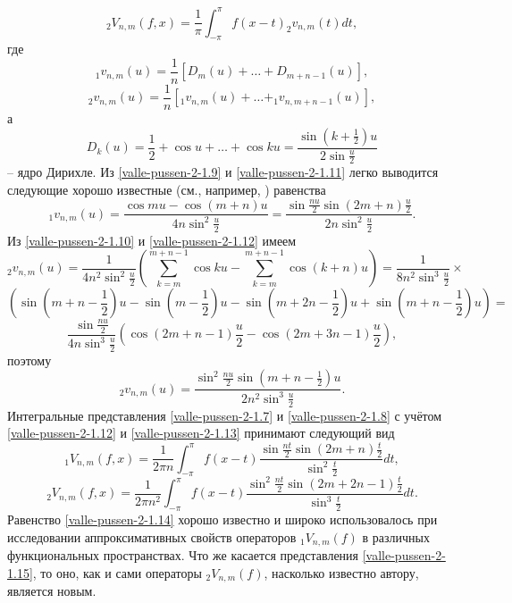 \begin{equation}\label{valle-pussen-2-1.8}
 _2V_{n,m}(f,x)=\frac{1}{\pi}\int_{-\pi}^\pi f(x-t)_2v_{n,m}(t)dt,
 \end{equation}
где
\begin{equation}\label{valle-pussen-2-1.9}
 _1v_{n,m}(u)=\frac{1}{n}[D_m(u)+\ldots+D_{m+n-1}(u)],
 \end{equation}
\begin{equation}\label{valle-pussen-2-1.10}
 _2v_{n,m}(u)=\frac{1}{n}[_1v_{n,m}(u)+\ldots+_1v_{n,m+n-1}(u)],
 \end{equation}
 а
\begin{equation}\label{valle-pussen-2-1.11}
D_k(u) =\frac{1}{2}+\cos u +\ldots+\cos ku =\frac{\sin(k+\frac12)u}{2\sin\frac{u}{2}}
 \end{equation}
-- ядро Дирихле. Из \eqref{valle-pussen-2-1.9} и \eqref{valle-pussen-2-1.11} легко выводится следующие хорошо известные (см., например, \cite{valle-pussen-2-Zhuk}) равенства
\begin{equation}\label{valle-pussen-2-1.12}
_1v_{n,m}(u) =\frac{\cos mu-\cos (m+n)u}{4n\sin^2\frac{u}{2}}=
\frac{\sin\frac{nu}{2}\sin(2m+n)\frac{u}{2}}{2n\sin^2\frac{u}{2}}.
 \end{equation}
Из \eqref{valle-pussen-2-1.10} и \eqref{valle-pussen-2-1.12} имеем
\begin{equation*}
 _2v_{n,m}(u)=\frac{1}{4n^2\sin^2\frac{u}{2}}\left(\sum_{k=m}^{m+n-1}\cos ku-
 \sum_{k=m}^{m+n-1}\cos(k+n)u\right)=\frac{1}{8n^2\sin^3\frac{u}{2}}\times
 \end{equation*}
\begin{equation*}
 \left(\sin(m+n-\frac12)u-\sin(m-\frac12)u
 -\sin(m+2n-\frac12)u+\sin(m+n-\frac12)u\right)=
 \end{equation*}
\begin{equation*}
 \frac{\sin\frac{nu}{2}}{4n\sin^3\frac{u}{2}}
 \left(\cos(2m+n-1)\frac{u}{2}-\cos(2m+3n-1)\frac{u}{2}\right),
  \end{equation*}
поэтому
\begin{equation}\label{valle-pussen-2-1.13}
 _2v_{n,m}(u)=\frac{\sin^2\frac{nu}{2}\sin(m+n-\frac12)u}{2n^2\sin^3\frac{u}{2}}.
  \end{equation}
Интегральные представления \eqref{valle-pussen-2-1.7} и \eqref{valle-pussen-2-1.8} с учётом  \eqref{valle-pussen-2-1.12} и \eqref{valle-pussen-2-1.13}  принимают следующий вид
\begin{equation}\label{valle-pussen-2-1.14}
 _1V_{n,m}(f,x)=\frac{1}{2\pi n}\int_{-\pi}^\pi f(x-t) \frac{\sin\frac{nt}{2}\sin(2m+n)\frac{t}{2}}{\sin^2\frac{t}{2}}dt,
 \end{equation}
\begin{equation}\label{valle-pussen-2-1.15}
 _2V_{n,m}(f,x)=\frac{1}{2\pi n^2}\int_{-\pi}^\pi f(x-t) \frac{\sin^2\frac{nt}{2}\sin(2m+2n-1)\frac{t}{2}}{\sin^3\frac{t}{2}}dt.
 \end{equation}
Равенство \eqref{valle-pussen-2-1.14} хорошо известно и широко использовалось \cite{valle-pussen-2-Zhuk} при исследовании аппроксимативных свойств операторов $_1V_{n,m}(f)$ в различных функциональных пространствах.  Что же касается представления \eqref{valle-pussen-2-1.15}, то оно, как и сами операторы  $ _2V_{n,m}(f)$,
насколько известно автору, является новым.

